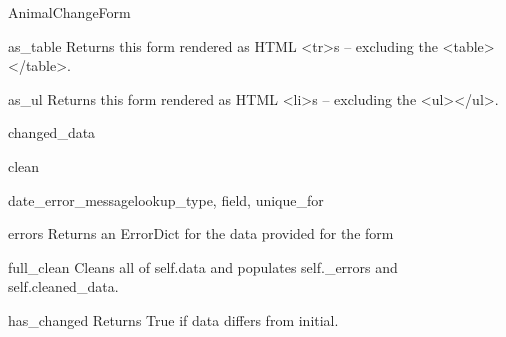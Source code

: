 \documentclass[letterpaper,10pt,english]{sphinxmanual}
\begin{document}
\begin{classdesc}{AnimalChangeForm}
\hypertarget{animal.forms.AnimalChangeForm.as_table}{}\begin{methoddesc}[AnimalChangeForm]{as\_table}{}
Returns this form rendered as HTML \textless{}tr\textgreater{}s -- excluding the \textless{}table\textgreater{}\textless{}/table\textgreater{}.
\end{methoddesc}

\hypertarget{animal.forms.AnimalChangeForm.as_ul}{}\begin{methoddesc}[AnimalChangeForm]{as\_ul}{}
Returns this form rendered as HTML \textless{}li\textgreater{}s -- excluding the \textless{}ul\textgreater{}\textless{}/ul\textgreater{}.
\end{methoddesc}

\hypertarget{animal.forms.AnimalChangeForm.changed_data}{}\begin{memberdesc}[AnimalChangeForm]{changed\_data}\end{memberdesc}

\hypertarget{animal.forms.AnimalChangeForm.clean}{}\begin{methoddesc}[AnimalChangeForm]{clean}{}\end{methoddesc}

\hypertarget{animal.forms.AnimalChangeForm.date_error_message}{}\begin{methoddesc}[AnimalChangeForm]{date\_error\_message}{lookup\_type, field, unique\_for}\end{methoddesc}

\hypertarget{animal.forms.AnimalChangeForm.errors}{}\begin{memberdesc}[AnimalChangeForm]{errors}
Returns an ErrorDict for the data provided for the form
\end{memberdesc}

\hypertarget{animal.forms.AnimalChangeForm.full_clean}{}\begin{methoddesc}[AnimalChangeForm]{full\_clean}{}
Cleans all of self.data and populates self.\_errors and
self.cleaned\_data.
\end{methoddesc}

\hypertarget{animal.forms.AnimalChangeForm.has_changed}{}\begin{methoddesc}[AnimalChangeForm]{has\_changed}{}
Returns True if data differs from initial.
\end{methoddesc}


\end{classdesc}
\end{document}
